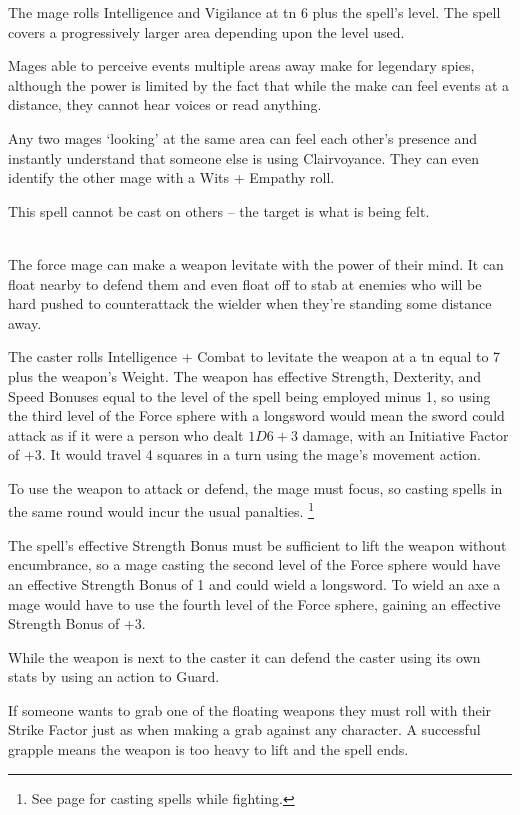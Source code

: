\begin{multicols}{2}
The mage rolls Intelligence and Vigilance at \gls{tn} 6 plus the spell's level.
The spell covers a progressively larger area depending upon the level used.

Mages able to perceive events multiple areas away make for legendary spies, although the power is limited by the fact that while the make can feel events at a distance, they cannot hear voices or read anything.

Any two mages `looking' at the same area can feel each other's presence and instantly understand that someone else is using Clairvoyance.
They can even identify the other mage with a Wits + Empathy roll.

This spell cannot be cast on others -- the target is what is being felt.

\\
The force mage can make a weapon levitate with the power of their mind. It can float nearby to defend them and even float off to stab at enemies who will be hard pushed to counterattack the wielder when they're standing some distance away.

The caster rolls Intelligence + Combat to levitate the weapon at a \gls{tn} equal to 7 plus the weapon's Weight.
The weapon has effective Strength, Dexterity, and Speed Bonuses equal to the level of the spell being employed minus 1, so using the third level of the Force sphere with a longsword would mean the sword could attack as if it were a person who dealt $1D6+3$ damage, with an Initiative Factor of +3.
It would travel 4 squares in a turn using the mage's movement action.

To use the weapon to attack or defend, the mage must focus, so casting spells in the same round would incur the usual panalties.%
\footnote{See page \pageref{combatcasting} for casting spells while fighting.}

The spell's effective Strength Bonus must be sufficient to lift the weapon without encumbrance, so a mage casting the second level of the Force sphere would have an effective Strength Bonus of 1 and could wield a longsword.
To wield an axe a mage would have to use the fourth level of the Force sphere, gaining an effective Strength Bonus of +3.

While the weapon is next to the caster it can defend the caster using its own stats by using an action to Guard.

If someone wants to grab one of the floating weapons they must roll with their Strike Factor just as when making a grab against any character.
A successful grapple means the weapon is too heavy to lift and the spell ends.


\end{multicols}
